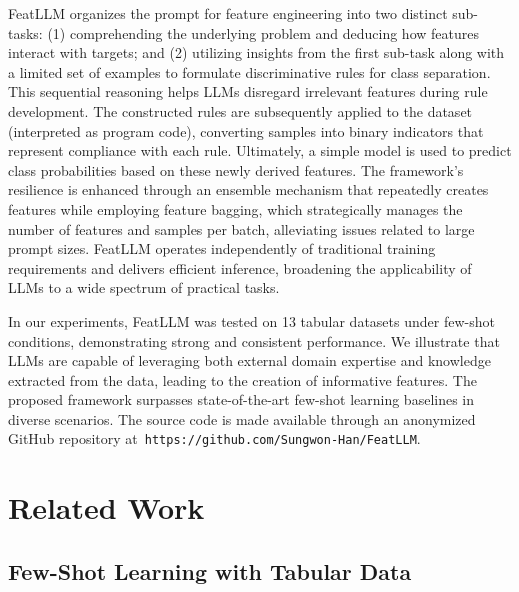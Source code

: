 \textsf{FeatLLM} organizes the prompt for feature engineering into two distinct sub-tasks: (1) comprehending the underlying problem and deducing how features interact with targets; and (2) utilizing insights from the first sub-task along with a limited set of examples to formulate discriminative rules for class separation. This sequential reasoning helps LLMs disregard irrelevant features during rule development. The constructed rules are subsequently applied to the dataset (interpreted as program code), converting samples into binary indicators that represent compliance with each rule. Ultimately, a simple model is used to predict class probabilities based on these newly derived features. The framework's resilience is enhanced through an ensemble mechanism that repeatedly creates features while employing feature bagging, which strategically manages the number of features and samples per batch, alleviating issues related to large prompt sizes. \textsf{FeatLLM} operates independently of traditional training requirements and delivers efficient inference, broadening the applicability of LLMs to a wide spectrum of practical tasks.

In our experiments, \textsf{FeatLLM} was tested on 13 tabular datasets under few-shot conditions, demonstrating strong and consistent performance. We illustrate that LLMs are capable of leveraging both external domain expertise and knowledge extracted from the data, leading to the creation of informative features. The proposed framework surpasses state-of-the-art few-shot learning baselines in diverse scenarios. The source code is made available through an anonymized GitHub repository at~\texttt{https://github.com/Sungwon-Han/FeatLLM}.

\section{Related Work}

\subsection{Few-Shot Learning with Tabular Data}

